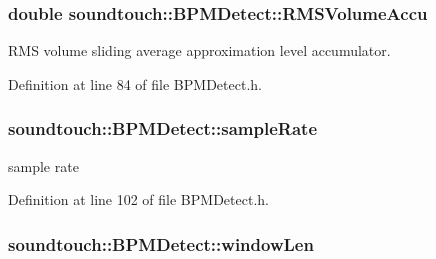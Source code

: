 \subsubsection[{\texorpdfstring{R\+M\+S\+Volume\+Accu}{RMSVolumeAccu}}]{\setlength{\rightskip}{0pt plus 5cm}double soundtouch\+::\+B\+P\+M\+Detect\+::\+R\+M\+S\+Volume\+Accu\hspace{0.3cm}{\ttfamily [protected]}}\hypertarget{classsoundtouch_1_1_b_p_m_detect_af5b5e5634dbef9bcb0f6a1b883aa2aef}{}\label{classsoundtouch_1_1_b_p_m_detect_af5b5e5634dbef9bcb0f6a1b883aa2aef}


R\+MS volume sliding average approximation level accumulator. 



Definition at line 84 of file B\+P\+M\+Detect.\+h.

\subsubsection[{\texorpdfstring{sample\+Rate}{sampleRate}}]{ soundtouch\+::\+B\+P\+M\+Detect\+::sample\+Rate\hspace{0.3cm}{\ttfamily [protected]}}\hypertarget{classsoundtouch_1_1_b_p_m_detect_a9c0ca4351a4239dab4ad4d4655d7b8c9}{}\label{classsoundtouch_1_1_b_p_m_detect_a9c0ca4351a4239dab4ad4d4655d7b8c9}


sample rate 



Definition at line 102 of file B\+P\+M\+Detect.\+h.

\subsubsection[{\texorpdfstring{window\+Len}{windowLen}}]{ soundtouch\+::\+B\+P\+M\+Detect\+::window\+Len\hspace{0.3cm}{\ttfamily [protected]}}\hypertarget{classsoundtouch_1_1_b_p_m_detect_af9a188ccdf522ec40b11d1da2fa80ace}{}\label{classsoundtouch_1_1_b_p_m_detect_af9a188ccdf522ec40b11d1da2fa80ace}


